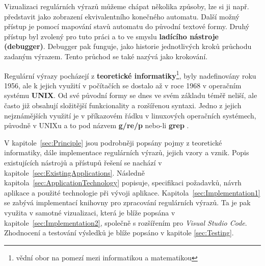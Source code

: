 Vizualizaci regulárních výrazů můžeme chápat několika způsoby, lze si ji např. představit jako zobrazení ekvivalentního konečného automatu.
Další možný přístup je pomocí mapování stavů automatu do původní textové formy. 
Druhý přístup byl zvolený pro tuto práci a to ve smyslu \textbf{ladícího nástroje (debugger)}. 
Debugger pak funguje, jako historie jednotlivých kroků průchodu zadaným výrazem. 
Tento průchod se také nazývá jako krokování.

Regulární výrazy pocházejí z \textbf{teoretické informatiky}\footnote{vědní obor na pomezí mezi informatikou a matematikou}, 
byly nadefinovány roku 1956, ale k jejich využití v počítačích se dostalo až v roce 1968 v operačním systému \textbf{UNIX}.
Od své původní formy se dnes ve svém základu téměř neliší, ale často již obsahují složitější funkcionality a rozšířenou syntaxi.
Jedno z jejich nejznámějších využití je v příkazovém řádku v linuxových operačních systémech, původně v UNIXu a to pod názvem \textbf{g/re/p} nebo-li \textbf{grep} 
\cite{Wikipedia_2024}. 

V kapitole~\ref{sec:Principle} jsou podrobněji popsány pojmy z teoretické informatiky, dále implementace regulárních výrazů, jejich vzory a vznik.
Popis existujících nástrojů a přístupů řešení se nachází v kapitole~\ref{sec:ExistingApplications}.
Následně kapitola~\ref{sec:ApplicationTechnology} popisuje, specifikaci požadavků, návrh aplikace a použité technologie při vývoji aplikace.
Kapitola~\ref{sec:Implementation1} se zabývá implementací knihovny pro zpracování regulárních výrazů. 
Ta je pak využita v samotné vizualizaci, která je blíže popsána v kapitole~\ref{sec:Implementation2}, společně s rozšířením pro \textit{Visual Studio Code}.
Zhodnocení a testování výsledků je blíže popsáno v kapitole \ref{sec:Testing}.

\endinput